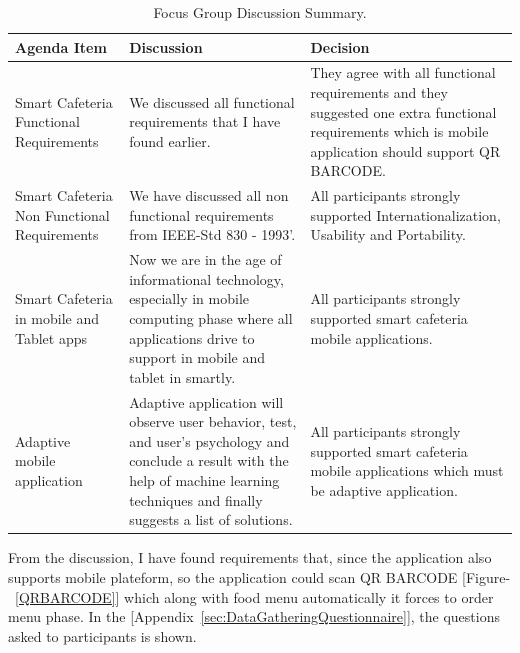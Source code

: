\begin{table}[h!t]
\centering
 \begin{tabular}{| p{3cm} | p{4.5cm} | p{4.5cm} |}
    \hline
    Agenda Item & Discussion &  Decision\\ \hline
    
    Smart Cafeteria Functional Requirements & We discussed all functional
    requirements that I have found earlier. & They agree with all functional
    requirements and they suggested one extra functional requirements which is
    mobile application should support QR BARCODE. \\ \hline
    
    Smart Cafeteria Non Functional Requirements & We have discussed all non
    functional requirements from IEEE-Std 830 - 1993'.& All participants strongly
    supported Internationalization, Usability and Portability.\\ \hline
   
    Smart Cafeteria in mobile and Tablet apps & Now we are in the age of
    informational technology, especially in mobile computing phase where all
    applications drive to support in mobile and tablet in smartly. & All
    participants strongly supported smart cafeteria mobile applications.\\ \hline
    
    Adaptive mobile application & Adaptive application will observe user
    behavior, test, and user's psychology and conclude a result with the help of
    machine learning techniques and finally suggests a list of solutions. & All
    participants strongly supported smart cafeteria mobile applications which
    must be adaptive application.\\ \hline
       \end{tabular}
 \caption{Focus Group Discussion Summary.}
\label{tab:FocusGroup}
\end{table}

From the discussion, I have found requirements that, since the application also
supports mobile plateform, so the application could scan QR BARCODE
[Figure-~\ref{QRBARCODE}] which along with food menu automatically it forces to
order menu phase. In the [Appendix~\ref{sec:DataGatheringQuestionnaire}], the
questions asked to participants is shown.

